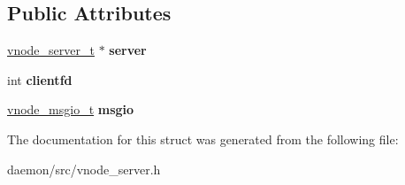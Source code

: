 \subsection*{Public Attributes}
\begin{DoxyCompactItemize}
\item 
\hypertarget{structcliententry_a8996f183f58a07f84728739dac2e88fc}{\hyperlink{structvnode__server__t}{vnode\+\_\+server\+\_\+t} $\ast$ {\bfseries server}}\label{structcliententry_a8996f183f58a07f84728739dac2e88fc}

\item 
\hypertarget{structcliententry_a5da0c8a9bf50b5c699745ab0f8fa41e8}{int {\bfseries clientfd}}\label{structcliententry_a5da0c8a9bf50b5c699745ab0f8fa41e8}

\item 
\hypertarget{structcliententry_a1ce643c3fb589997e9112f2d73213a97}{\hyperlink{structvnode__msgio}{vnode\+\_\+msgio\+\_\+t} {\bfseries msgio}}\label{structcliententry_a1ce643c3fb589997e9112f2d73213a97}

\end{DoxyCompactItemize}


The documentation for this struct was generated from the following file\+:\begin{DoxyCompactItemize}
\item 
daemon/src/vnode\+\_\+server.\+h\end{DoxyCompactItemize}
